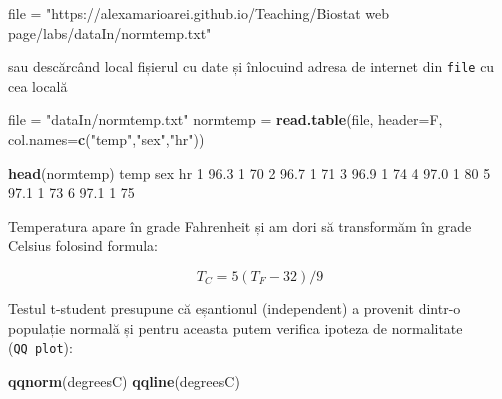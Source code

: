 \documentclass[]{article}
\newenvironment{Shaded}{\begin{snugshade}}{\end{snugshade}}
\newcommand{\KeywordTok}[1]{\textcolor[rgb]{0.13,0.29,0.53}{\textbf{#1}}}
\newcommand{\DataTypeTok}[1]{\textcolor[rgb]{0.13,0.29,0.53}{#1}}
\newcommand{\DecValTok}[1]{\textcolor[rgb]{0.00,0.00,0.81}{#1}}
\newcommand{\FloatTok}[1]{\textcolor[rgb]{0.00,0.00,0.81}{#1}}
\newcommand{\StringTok}[1]{\textcolor[rgb]{0.31,0.60,0.02}{#1}}
\newcommand{\OperatorTok}[1]{\textcolor[rgb]{0.81,0.36,0.00}{\textbf{#1}}}
\newcommand{\NormalTok}[1]{#1}
\begin{document}
\begin{Shaded}
\begin{Highlighting}[]
\NormalTok{file =}\StringTok{ "https://alexamarioarei.github.io/Teaching/Biostat web page/labs/dataIn/normtemp.txt"}
\end{Highlighting}
\end{Shaded}

sau descărcând local fișierul cu date și înlocuind adresa de internet
din \texttt{file} cu cea locală

\begin{Shaded}
\begin{Highlighting}[]
\NormalTok{file =}\StringTok{ "dataIn/normtemp.txt"}
\NormalTok{normtemp =}\StringTok{ }\KeywordTok{read.table}\NormalTok{(file, }\DataTypeTok{header=}\NormalTok{F, }\DataTypeTok{col.names=}\KeywordTok{c}\NormalTok{(}\StringTok{"temp"}\NormalTok{,}\StringTok{"sex"}\NormalTok{,}\StringTok{"hr"}\NormalTok{))}

\KeywordTok{head}\NormalTok{(normtemp)}
\NormalTok{  temp sex hr}
\DecValTok{1} \FloatTok{96.3}   \DecValTok{1} \DecValTok{70}
\DecValTok{2} \FloatTok{96.7}   \DecValTok{1} \DecValTok{71}
\DecValTok{3} \FloatTok{96.9}   \DecValTok{1} \DecValTok{74}
\DecValTok{4} \FloatTok{97.0}   \DecValTok{1} \DecValTok{80}
\DecValTok{5} \FloatTok{97.1}   \DecValTok{1} \DecValTok{73}
\DecValTok{6} \FloatTok{97.1}   \DecValTok{1} \DecValTok{75}
\end{Highlighting}
\end{Shaded}

Temperatura apare în grade Fahrenheit și am dori să transformăm în grade
Celsius folosind formula:

\[
  T_C = 5(T_F-32)/9
\]

\begin{Shaded}
\end{Shaded}

Testul t-student presupune că eșantionul (independent) a provenit
dintr-o populație normală și pentru aceasta putem verifica ipoteza de
normalitate (\texttt{QQ\ plot}):

\begin{Shaded}
\begin{Highlighting}[]
\KeywordTok{qqnorm}\NormalTok{(degreesC)}
\KeywordTok{qqline}\NormalTok{(degreesC)}
\end{Highlighting}
\end{Shaded}
\end{document}
